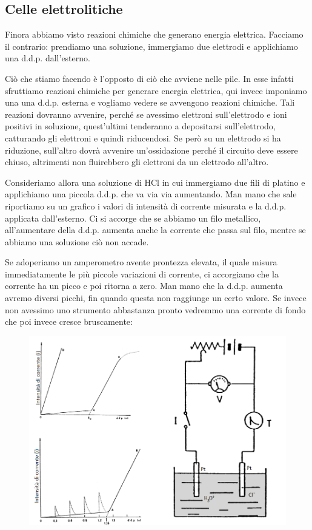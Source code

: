 \subsection{Celle elettrolitiche}
Finora abbiamo visto reazioni chimiche che generano energia elettrica. Facciamo il contrario: prendiamo una soluzione, immergiamo due elettrodi e applichiamo una d.d.p. dall'esterno.

Ciò che stiamo facendo è l'opposto di ciò che avviene nelle pile. In esse infatti sfruttiamo reazioni chimiche per generare energia elettrica, qui invece imponiamo una una d.d.p. esterna e vogliamo vedere se avvengono reazioni chimiche. Tali reazioni dovranno avvenire, perché se avessimo elettroni sull'elettrodo e ioni positivi in soluzione, quest'ultimi tenderanno a depositarsi sull'elettrodo, catturando gli elettroni e quindi riducendosi. Se però su un elettrodo si ha riduzione, sull'altro dovrà avvenire un'ossidazione perché il circuito deve essere chiuso, altrimenti non fluirebbero gli elettroni da un elettrodo all'altro.

Consideriamo allora una soluzione di HCl in cui immergiamo due fili di platino e applichiamo una piccola d.d.p. che va via via aumentando. Man mano che sale riportiamo su un grafico i valori di intensità di corrente misurata e la d.d.p. applicata dall'esterno. Ci si accorge che se abbiamo un filo metallico, all'aumentare della d.d.p. aumenta anche la corrente che passa sul filo, mentre se abbiamo una soluzione ciò non accade.

Se adoperiamo un amperometro avente prontezza elevata, il quale misura immediatamente le più piccole variazioni di corrente, ci accorgiamo che la corrente ha un picco e poi ritorna a zero. Man mano che la d.d.p. aumenta avremo diversi picchi, fin quando questa non raggiunge un certo valore. Se invece non avessimo uno strumento abbastanza pronto vedremmo una corrente di fondo che poi invece cresce bruscamente:

\vspace{-0.5cm}\begin{figure}[H]
    \centering
    \includegraphics[width=14cm]{immagini/elettrolisi.png}
\end{figure}

